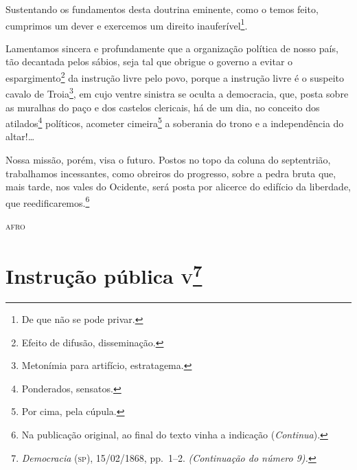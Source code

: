 Sustentando os fundamentos desta doutrina eminente, como o temos feito,
cumprimos um dever e exercemos um direito inauferível\footnote{De que
  não se pode privar.}.

Lamentamos sincera e profundamente que a organização política de nosso
país, tão decantada pelos sábios, seja tal que obrigue o governo a
evitar o espargimento\footnote{Efeito de difusão, disseminação.} da
instrução livre pelo povo, porque a instrução livre é o suspeito cavalo
de Troia\footnote{Metonímia para artifício, estratagema.}, em cujo
ventre sinistra se oculta a democracia, que, posta sobre as muralhas do
paço e dos castelos clericais, há de um dia, no conceito dos
atilados\footnote{Ponderados, sensatos.} políticos, acometer
cimeira\footnote{Por cima, pela cúpula.} a soberania do trono e a
independência do altar!\ldots{}

Nossa missão, porém, visa o futuro. Postos no topo da coluna do
septentrião, trabalhamos incessantes, como obreiros do progresso, sobre
a pedra bruta que, mais tarde, nos vales do Ocidente, será posta por
alicerce do edifício da liberdade, que reedificaremos.\footnote{Na publicação original, ao final do texto vinha a indicação (\emph{Continua}).}



\begin{flushright}
\textsc{afro}
\end{flushright}

\chapter{Instrução pública \textsc{v}\footnote{\emph{Democracia} (\textsc{sp}),
  15/02/1868, pp.~1--2. \emph{(Continuação do número 9).}}}

